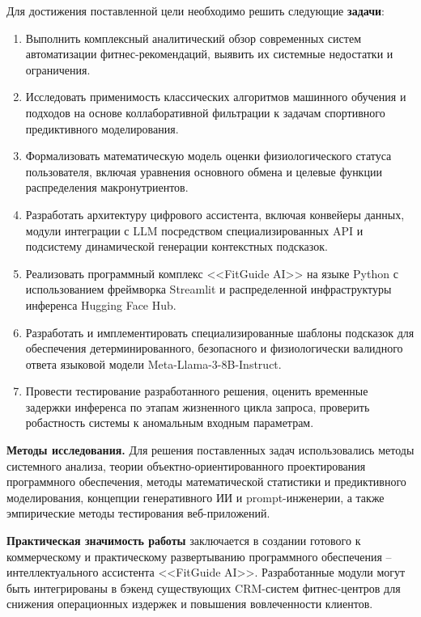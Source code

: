 \documentclass[14pt, a4paper]{extarticle}
\begin{document}
Для достижения поставленной цели необходимо решить следующие \textbf{задачи}:
\begin{enumerate}
    \item Выполнить комплексный аналитический обзор современных систем автоматизации фитнес-рекомендаций, выявить их системные недостатки и ограничения.
    \item Исследовать применимость классических алгоритмов машинного обучения и подходов на основе коллаборативной фильтрации к задачам спортивного предиктивного моделирования.
    \item Формализовать математическую модель оценки физиологического статуса пользователя, включая уравнения основного обмена и целевые функции распределения макронутриентов.
    \item Разработать архитектуру цифрового ассистента, включая конвейеры данных, модули интеграции с LLM посредством специализированных API и подсистему динамической генерации контекстных подсказок.
    \item Реализовать программный комплекс <<FitGuide AI>> на языке Python с использованием фреймворка Streamlit и распределенной инфраструктуры инференса Hugging Face Hub.
    \item Разработать и имплементировать специализированные шаблоны подсказок для обеспечения детерминированного, безопасного и физиологически валидного ответа языковой модели Meta-Llama-3-8B-Instruct.
    \item Провести тестирование разработанного решения, оценить временные задержки инференса по этапам жизненного цикла запроса, проверить робастность системы к аномальным входным параметрам.
\end{enumerate}

\textbf{Методы исследования.} Для решения поставленных задач использовались методы системного анализа, теории объектно-ориентированного проектирования программного обеспечения, методы математической статистики и предиктивного моделирования, концепции генеративного ИИ и prompt-инженерии, а также эмпирические методы тестирования веб-приложений.

\textbf{Практическая значимость работы} заключается в создании готового к коммерческому и практическому развертыванию программного обеспечения -- интеллектуального ассистента <<FitGuide AI>>. Разработанные модули могут быть интегрированы в бэкенд существующих CRM-систем фитнес-центров для снижения операционных издержек и повышения вовлеченности клиентов.

\newpage
\end{document}
